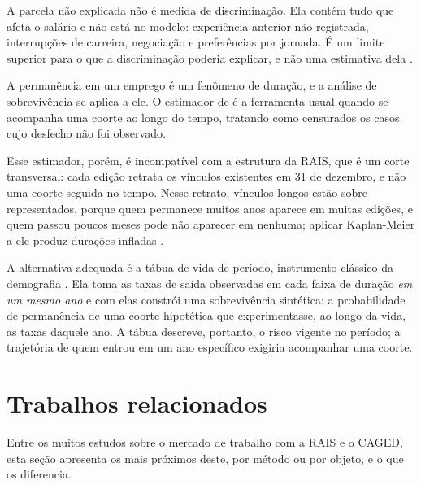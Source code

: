 A parcela não explicada não é medida de discriminação. Ela contém tudo que afeta o salário e não está no modelo: experiência anterior não registrada, interrupções de carreira, negociação e preferências por jornada. É um limite superior para o que a discriminação poderia explicar, e não uma estimativa dela \cite{Jann2008}.

A permanência em um emprego é um fenômeno de duração, e a análise de sobrevivência se aplica a ele. O estimador de  é a ferramenta usual quando se acompanha uma coorte ao longo do tempo, tratando como censurados os casos cujo desfecho não foi observado.

Esse estimador, porém, é incompatível com a estrutura da RAIS, que é um corte transversal: cada edição retrata os vínculos existentes em 31 de dezembro, e não uma coorte seguida no tempo. Nesse retrato, vínculos longos estão sobre-representados, porque quem permanece muitos anos aparece em muitas edições, e quem passou poucos meses pode não aparecer em nenhuma; aplicar Kaplan-Meier a ele produz durações infladas \cite{Preston2001}.

A alternativa adequada é a tábua de vida de período, instrumento clássico da demografia \cite{Preston2001}. Ela toma as taxas de saída observadas em cada faixa de duração \textit{em um mesmo ano} e com elas constrói uma sobrevivência sintética: a probabilidade de permanência de uma coorte hipotética que experimentasse, ao longo da vida, as taxas daquele ano. A tábua descreve, portanto, o risco vigente no período; a trajetória de quem entrou em um ano específico exigiria acompanhar uma coorte.

\section{Trabalhos relacionados}
\label{sec:relacionados}

Entre os muitos estudos sobre o mercado de trabalho com a RAIS e o CAGED, esta seção apresenta os mais próximos deste, por método ou por objeto, e o que os diferencia.

